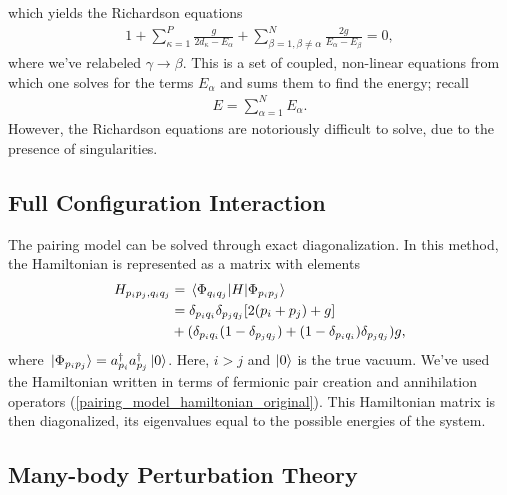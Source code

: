 \documentclass[Dual]{msu-thesis}
\begin{document}
which yields the Richardson equations
\begin{align}
\label{richardson_equations}
1
+
\sum_{\kappa=1}^P
\frac{g}{2d_\kappa-E_\alpha}
+
\sum_{\beta=1,\beta\neq\alpha}^N
\frac{2g}{E_\alpha-E_\beta}
=
0
,\end{align}
where we've relabeled $\gamma\to\beta$. This is a set of coupled, non-linear equations from which one solves for the terms $E_\alpha$ and sums them to find the energy; recall
\begin{align}
E=\sum_{\alpha=1}^N E_\alpha
.\end{align}
However, the Richardson equations are notoriously difficult to solve, due to the presence of singularities.

\subsection{Full Configuration Interaction}

The pairing model can be solved through exact diagonalization. In this method, the Hamiltonian is represented as a matrix with elements
\begin{align}
H_{p_ip_j,q_iq_j}
&=
\mel*{\Phi_{q_iq_j}}H{\Phi_{p_ip_j}}
\nonumber
\\
&=
\delta_{p_iq_i}\delta_{p_jq_j}[2(p_i+p_j)+g]
\nonumber
\\
&+
(\delta_{p_iq_i}(1-\delta_{p_jq_j})+(1-\delta_{p_iq_i})\delta_{p_jq_j})g
,\end{align}
where $\ket*{\Phi_{p_ip_j}}= a^\dagger_{p_i}a^\dagger_{p_j}\ket{0}$. Here, $i>j$ and $\ket{0}$ is the true vacuum. We've used the Hamiltonian written in terms of fermionic pair creation and annihilation operators (\ref{pairing_model_hamiltonian_original}). This Hamiltonian matrix is then diagonalized, its eigenvalues equal to the possible energies of the system.

\subsection{Many-body Perturbation Theory}
\label{subsection:mbpt}
\end{document}
